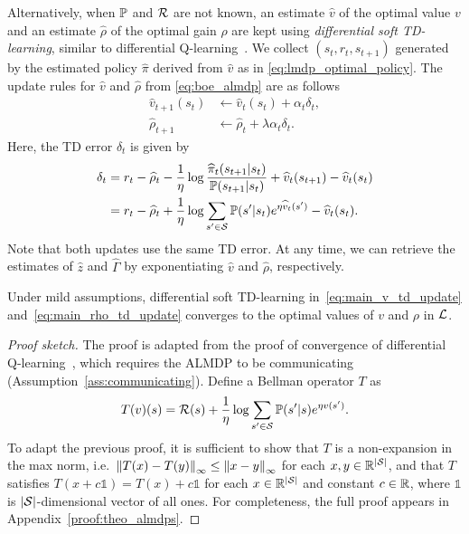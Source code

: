Alternatively, when $\mathbb{P}$ and $\mathcal{R}$ are not known, an estimate $\widehat v$ of the optimal value $v$ and an estimate $\widehat\rho$ of the optimal gain $\rho$ are kept using \textit{differential soft TD-learning}, similar to differential Q-learning~\citep{Wan2021}. We collect $(s_t, r_t, s_{t+1})$ generated by the estimated policy $\widehat\pi$ derived from $\widehat v$ as in \eqref{eq:lmdp_optimal_policy}. The update rules for $\widehat v$ and $\widehat \rho$ from \eqref{eq:boe_almdp} are as follows
\begin{align}
    \widehat{v}_{t+1}(s_t) &\gets \widehat{v}_t(s_t) + \alpha_t \delta_t,\label{eq:main_v_td_update}\\
    \widehat{\rho}_{t+1} &\gets \widehat{\rho}_t + \lambda \alpha_t \delta_t.\label{eq:main_rho_td_update}
    \end{align}
Here, the TD error $\delta_t$ is given by
\begin{align*}
\delta_t &= r_t - \widehat{\rho}_t - \frac 1 \eta \log \frac {\widehat{\pi}_t(s_{t+1}|s_t)} {\mathbb{P}(s_{t+1}|s_t)} + \widehat{v}_t(s_{t+1}) - \widehat{v}_t(s_t)\\
 &= r_t - \widehat{\rho}_t + \frac 1 \eta \log \sum_{s'\in\mathcal{S}} \mathbb{P}(s'|s_t) e^{\eta \widehat{v}_t(s')} - \widehat{v}_t(s_t).
\end{align*}
Note that both updates use the same TD error. At any time, we can retrieve the estimates of $\widehat z$ and $\widehat\Gamma$ by exponentiating $\widehat v$ and $\widehat \rho$, respectively.


\begin{theorem}
    Under mild assumptions, differential soft TD-learning in~\eqref{eq:main_v_td_update} and~\eqref{eq:main_rho_td_update} converges to the optimal values of $v$ and $\rho$ in $\mathcal{L}$. \label{theo:almdps}
\end{theorem}

\begin{proof}[Proof sketch]
The proof is adapted from the proof of convergence of differential Q-learning~\cite{Abounadi2001,Wan2021}, which requires the ALMDP to be communicating (Assumption~\ref{ass:communicating}).
Define a Bellman operator $T$ as
\[
T(v)(s) = \mathcal{R}(s) + \frac 1 \eta \log \sum_{s'\in\mathcal{S}} \mathbb{P}(s'|s) e^{ \eta v(s') }.
\]
To adapt the previous proof, it is sufficient to show that $T$ is a non-expansion in the max norm, i.e.~$\left\|T(x)-T(y)\right\|_\infty \leq \left\|x - y\right\|_\infty$ for each $x, y\in\mathbb{R}^{|\mathcal{S}|}$, and that $T$ satisfies $T(x + c\mathds{1}) = T(x) + c\mathds{1}$ for each $x\in\mathbb{R}^{|\mathcal{S}|}$ and constant $c\in\mathbb{R}$, where $\mathds{1}$ is $|\mathcal{S}|$-dimensional vector of all ones.
For completeness, the full proof appears in Appendix~\ref{proof:theo_almdps}.
\end{proof}

